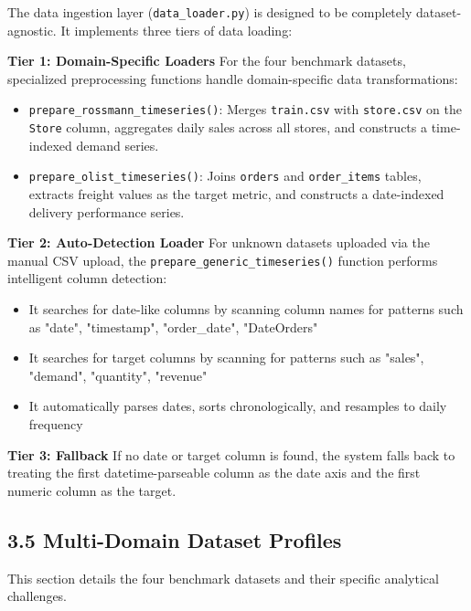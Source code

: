 \documentclass[12pt, a4paper]{report}
\begin{document}
The data ingestion layer (\texttt{data\_loader.py}) is designed to be completely dataset-agnostic. It implements three tiers of data loading:

\textbf{Tier 1: Domain-Specific Loaders}
For the four benchmark datasets, specialized preprocessing functions handle domain-specific data transformations:

\begin{itemize}
\item \texttt{prepare\_rossmann\_timeseries()}: Merges \texttt{train.csv} with \texttt{store.csv} on the \texttt{Store} column, aggregates daily sales across all stores, and constructs a time-indexed demand series.
\item \texttt{prepare\_olist\_timeseries()}: Joins \texttt{orders} and \texttt{order\_items} tables, extracts freight values as the target metric, and constructs a date-indexed delivery performance series.
\end{itemize}

\textbf{Tier 2: Auto-Detection Loader}
For unknown datasets uploaded via the manual CSV upload, the \texttt{prepare\_generic\_timeseries()} function performs intelligent column detection:
\begin{itemize}
\item It searches for date-like columns by scanning column names for patterns such as "date", "timestamp", "order\_date", "DateOrders"
\item It searches for target columns by scanning for patterns such as "sales", "demand", "quantity", "revenue"
\item It automatically parses dates, sorts chronologically, and resamples to daily frequency
\end{itemize}

\textbf{Tier 3: Fallback}
If no date or target column is found, the system falls back to treating the first datetime-parseable column as the date axis and the first numeric column as the target.

\subsection{3.5 Multi-Domain Dataset Profiles}

This section details the four benchmark datasets and their specific analytical challenges.
\end{document}

